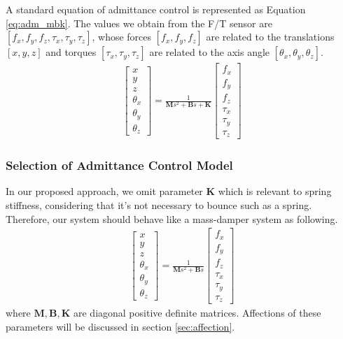 \par
A standard equation of admittance control is represented as Equation \ref{eq:adm_mbk}. The values we obtain from the F/T sensor are $\left[f_x, f_y, f_z,\tau _x, \tau _y, \tau _z \right]$, whose forces $ \left[f_x, f_y, f_z\right]$ are related to the translations $ \left[x, y, z\right]$ and torques $ \left[\tau _x, \tau _y, \tau _z\right]$ are related to the axis angle $ \left[\theta _x,\theta _y,\theta _z\right]$. 
\begin{equation}
\label{eq:adm_mbk}
\begin{split}
\begin{bmatrix}
x \\
y \\
z \\
\theta _x \\
\theta _y \\
\theta _z 
\end{bmatrix}
=
\frac{1}{\mathbf{M}s^2+\mathbf{B}s+\mathbf{K}}
\begin{bmatrix}
f_x \\
f_y \\
f_z \\
\tau _x \\
\tau _y \\
\tau _z 
\end{bmatrix}
\end{split}
\end{equation}
\subsubsection{Selection of Admittance Control Model}
\hspace*{6mm}In our proposed approach, we omit parameter $\mathbf{K}$ which is relevant to spring stiffness, considering that it's not necessary to bounce such as a spring. Therefore, our system should behave like a mass-damper system as following.
\begin{equation}
\label{eq:adm_mb}
\begin{split}
\begin{bmatrix}
x \\
y \\
z \\
\theta _x \\
\theta _y \\
\theta _z 
\end{bmatrix}
=
\frac{1}{\mathbf{M}s^2+\mathbf{B}s}
\begin{bmatrix}
f_x \\
f_y \\
f_z \\
\tau _x \\
\tau _y \\
\tau _z 
\end{bmatrix}
\end{split}
\end{equation}
where $\mathbf{M},\mathbf{B},\mathbf{K}$ are diagonal positive definite matrices. Affections of these parameters will be discussed in section \ref{sec:affection}.
